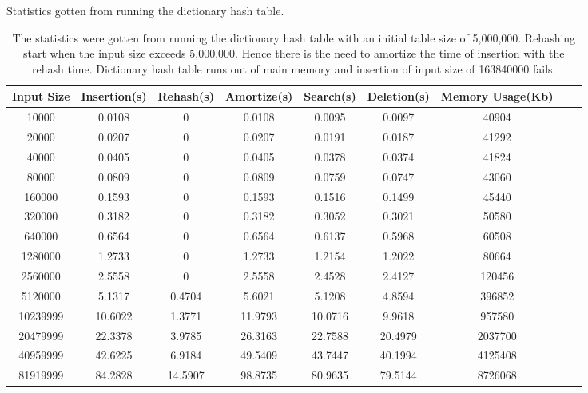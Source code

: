 \documentclass[a4paper,12pt, openany]{book}
\begin{document}
\begin{table}[H]
	\small\addtolength{\tabcolsep}{-5pt}
	
	\begin{center}
		\caption{Statistics gotten from running the dictionary hash table. }
		\label{tab:conpactchaining}
		\begin{tabular}{|c|c|c|c|c|c|c|c|c|} %
			\hline
			\textbf{Input Size}  & \textbf{Insertion(s)} & \textbf{Rehash(s)} & \textbf{Amortize(s)} & \textbf{Search(s)} & \textbf{Deletion(s)} & \textbf{Memory Usage(Kb)}\\
			\hline
			
			10000&	0.0108&	0&	0.0108&	0.0095&	0.0097&	40904\\
			20000&	0.0207&	0&	0.0207&	0.0191&	0.0187&	41292\\
			40000&	0.0405&	0&	0.0405&	0.0378&	0.0374&	41824\\
			80000&	0.0809&	0&	0.0809&	0.0759&	0.0747&	43060\\
			160000&	0.1593&	0&	0.1593&	0.1516&	0.1499&	45440\\
			320000&	0.3182&	0&	0.3182&	0.3052&	0.3021&	50580\\
			640000&	0.6564&	0&	0.6564&	0.6137&	0.5968&	60508\\
			1280000&	1.2733&	0&	1.2733&	1.2154&	1.2022&	80664\\
			2560000&	2.5558&	0&	2.5558&	2.4528&	2.4127&	120456\\
			5120000&	5.1317&	0.4704&	5.6021&	5.1208&	4.8594&	396852\\
			10239999&	10.6022&	1.3771&	11.9793&	10.0716&	9.9618&	957580\\
			20479999&	22.3378	&3.9785&	26.3163&	22.7588&	20.4979&	2037700\\
			40959999&	42.6225	&6.9184&	49.5409&	43.7447&	40.1994&	4125408\\
			81919999&	84.2828	&14.5907&	98.8735&	80.9635&	79.5144&	8726068\\
			
			\hline
			
			
			
			
		\end{tabular}\bigbreak
		\caption*{The statistics were gotten from running the dictionary hash table with an initial table size of 5,000,000. Rehashing start when the input size exceeds 5,000,000. Hence there is the need to amortize the time of insertion with the rehash time. Dictionary hash table runs out of main memory and insertion of input size of 163840000 fails.}
	\end{center}
\end{table}
\end{document}

